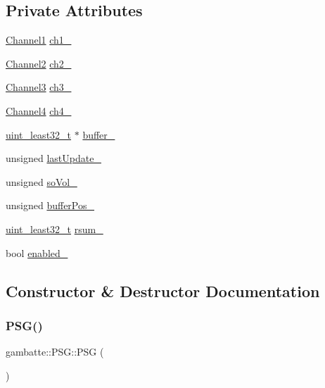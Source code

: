 \subsection*{Private Attributes}
\begin{DoxyCompactItemize}
\item 
\hyperlink{classgambatte_1_1Channel1}{Channel1} \hyperlink{classgambatte_1_1PSG_af0fe9a08bcfd12585bfbc0d662a1223f}{ch1\+\_\+}
\item 
\hyperlink{classgambatte_1_1Channel2}{Channel2} \hyperlink{classgambatte_1_1PSG_aafb5549adbd9f7be94c197f5aa94c36e}{ch2\+\_\+}
\item 
\hyperlink{classgambatte_1_1Channel3}{Channel3} \hyperlink{classgambatte_1_1PSG_a67a575f5983a8a966df2d390e309a928}{ch3\+\_\+}
\item 
\hyperlink{classgambatte_1_1Channel4}{Channel4} \hyperlink{classgambatte_1_1PSG_a63c5678a51ce09294b4b69e7760d4498}{ch4\+\_\+}
\item 
\hyperlink{namespacegambatte_a0639f09fccfbbd5a8e0796318768e370}{uint\+\_\+least32\+\_\+t} $\ast$ \hyperlink{classgambatte_1_1PSG_a870eb940e71a11d73b355fc5d607c612}{buffer\+\_\+}
\item 
unsigned \hyperlink{classgambatte_1_1PSG_a5d907b9175f86f2a2ff81fc238992c38}{last\+Update\+\_\+}
\item 
unsigned \hyperlink{classgambatte_1_1PSG_aeb17ad71a433bdbd37bd25f005f94541}{so\+Vol\+\_\+}
\item 
unsigned \hyperlink{classgambatte_1_1PSG_a4c5e616a303e6239d1cffc915dac15d5}{buffer\+Pos\+\_\+}
\item 
\hyperlink{namespacegambatte_a0639f09fccfbbd5a8e0796318768e370}{uint\+\_\+least32\+\_\+t} \hyperlink{classgambatte_1_1PSG_a4a213c93873c2aee256ff7d46fbfea0e}{rsum\+\_\+}
\item 
bool \hyperlink{classgambatte_1_1PSG_af2bb2ba109bd8800d6078597e6a8d689}{enabled\+\_\+}
\end{DoxyCompactItemize}


\subsection{Constructor \& Destructor Documentation}
\mbox{\label{classgambatte_1_1PSG_aa3dd35671196e7caf03ab488fa6768ed}} 
\subsubsection{\texorpdfstring{P\+S\+G()}{PSG()}}
{\footnotesize\ttfamily gambatte\+::\+P\+S\+G\+::\+P\+SG (\begin{DoxyParamCaption}{ }\end{DoxyParamCaption})}



